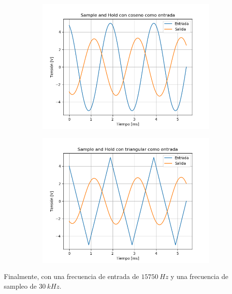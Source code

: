 \begin{figure}[H]
	\begin{subfigure}{.5\textwidth}
	\centering
	\includegraphics[width=\textwidth]{ImagenesEjercicio6/puntob1/SH - Cos.png}
	\end{subfigure}
	\begin{subfigure}{.5\textwidth}
	\centering
	\includegraphics[width=\textwidth]{ImagenesEjercicio6/puntob1/SH - Tri.png}
	\end{subfigure}
\end{figure}

Finalmente, con una frecuencia de entrada de $15750 \ Hz$ y una frecuencia de sampleo de $30 \ kHz$.


